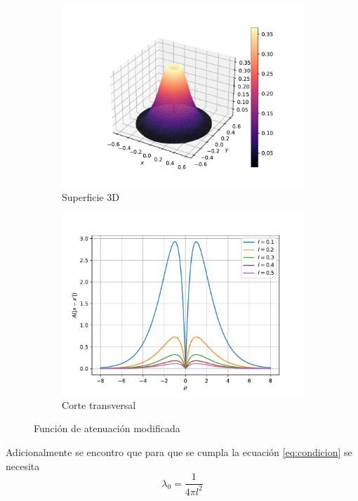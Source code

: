 \begin{figure}
    \centering
    \sffamily
    \begin{subfigure}{0.5\textwidth}
    \centering
        \includegraphics[width=\textwidth]{figuras/modificada3d.pdf}
        \caption{Superficie 3D}
        \label{fig:modificada.3d}
    \end{subfigure}
    \begin{subfigure}{0.5\textwidth}
    \centering
        \includegraphics[width=\textwidth]{figuras/modificada2dl.pdf}
        \caption{Corte transversal}
        \label{fig:modificada.sublabel}
    \end{subfigure}
    \caption{Función de atenuación modificada}
    \label{fig:modificada}
\end{figure}

Adicionalmente se encontro que para que se cumpla la ecuación \ref{eq:condicion} se necesita
\begin{equation}
	\lambda_0=\frac{1}{4\pi l^2}
\end{equation}
